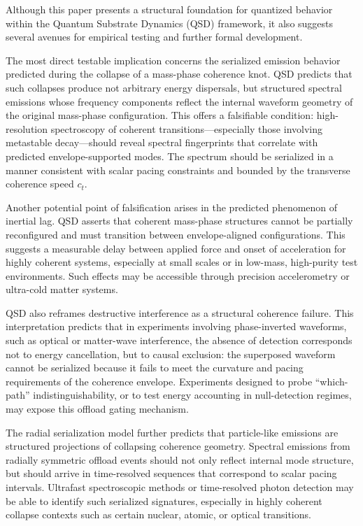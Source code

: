 \documentclass[entropy,article,submit,pdftex,oneauthor]{Definitions/mdpi}
\begin{document}
Although this paper presents a structural foundation for quantized behavior within the Quantum Substrate Dynamics (QSD) framework, it also suggests several avenues for empirical testing and further formal development.

The most direct testable implication concerns the serialized emission behavior predicted during the collapse of a mass-phase coherence knot. QSD predicts that such collapses produce not arbitrary energy dispersals, but structured spectral emissions whose frequency components reflect the internal waveform geometry of the original mass-phase configuration. This offers a falsifiable condition: high-resolution spectroscopy of coherent transitions—especially those involving metastable decay—should reveal spectral fingerprints that correlate with predicted envelope-supported modes. The spectrum should be serialized in a manner consistent with scalar pacing constraints and bounded by the transverse coherence speed \( c_t \).

Another potential point of falsification arises in the predicted phenomenon of inertial lag. QSD asserts that coherent mass-phase structures cannot be partially reconfigured and must transition between envelope-aligned configurations. This suggests a measurable delay between applied force and onset of acceleration for highly coherent systems, especially at small scales or in low-mass, high-purity test environments. Such effects may be accessible through precision accelerometry or ultra-cold matter systems.

QSD also reframes destructive interference as a structural coherence failure. This interpretation predicts that in experiments involving phase-inverted waveforms, such as optical or matter-wave interference, the absence of detection corresponds not to energy cancellation, but to causal exclusion: the superposed waveform cannot be serialized because it fails to meet the curvature and pacing requirements of the coherence envelope. Experiments designed to probe “which-path” indistinguishability, or to test energy accounting in null-detection regimes, may expose this offload gating mechanism.

The radial serialization model further predicts that particle-like emissions are structured projections of collapsing coherence geometry. Spectral emissions from radially symmetric offload events should not only reflect internal mode structure, but should arrive in time-resolved sequences that correspond to scalar pacing intervals. Ultrafast spectroscopic methods or time-resolved photon detection may be able to identify such serialized signatures, especially in highly coherent collapse contexts such as certain nuclear, atomic, or optical transitions.
\end{document}

